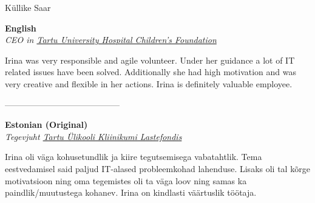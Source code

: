 \documentclass[a4paper, 12pt]{article}
\begin{document}
\newpage

\begin{center}
\LARGE{Küllike Saar}
\end{center}

\begin{center}
\textbf{English}\\
\textit{CEO in \href{https://www.lastefond.ee}{Tartu University Hospital Children's Foundation}}
\end{center}

Irina was very responsible and agile volunteer. Under her guidance a lot of IT related issues have been solved. Additionally she had high motivation and was very creative and flexible in her actions. Irina is definitely valuable employee.

\begin{center}
\------------------------------------------
\end{center}

\begin{center}
\textbf{Estonian (Original)}\\
\textit{Tegevjuht \href{https://www.lastefond.ee}{Tartu Ülikooli Kliinikumi Lastefondis}}
\end{center}

Irina oli väga kohusetundlik ja kiire tegutsemisega vabatahtlik. Tema eestvedamisel said paljud IT-alased probleemkohad lahenduse. Lisaks oli tal kõrge motivatsioon ning oma tegemistes oli ta väga loov ning samas ka paindlik/muutustega kohanev. Irina on kindlasti väärtuslik töötaja.
\end{document}
